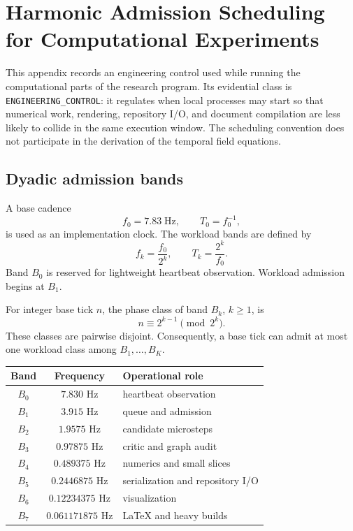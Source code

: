 \documentclass[11pt]{book}
\begin{document}
\appendix
\chapter[Harmonic Admission Scheduling]{Harmonic Admission Scheduling for Computational Experiments}
\label{app:harmonic-admission}

This appendix records an engineering control used while running the computational parts of the research program. Its evidential class is \texttt{ENGINEERING\_CONTROL}: it regulates when local processes may start so that numerical work, rendering, repository I/O, and document compilation are less likely to collide in the same execution window. The scheduling convention does not participate in the derivation of the temporal field equations.

\section{Dyadic admission bands}

A base cadence
\[
f_0 = 7.83\;\mathrm{Hz},
\qquad
T_0=f_0^{-1},
\]
is used as an implementation clock. The workload bands are defined by
\[
f_k=\frac{f_0}{2^k},
\qquad
T_k=\frac{2^k}{f_0}.
\]
Band $B_0$ is reserved for lightweight heartbeat observation. Workload admission begins at $B_1$.

For integer base tick $n$, the phase class of band $B_k$, $k\geq1$, is
\[
n\equiv 2^{k-1}\pmod{2^k}.
\]
These classes are pairwise disjoint. Consequently, a base tick can admit at most one workload class among $B_1,\ldots,B_K$.

\begin{center}
\begin{tabular}{ccl}
\hline
Band & Frequency & Operational role \\
\hline
$B_0$ & $7.830$ Hz & heartbeat observation \\
$B_1$ & $3.915$ Hz & queue and admission \\
$B_2$ & $1.9575$ Hz & candidate microsteps \\
$B_3$ & $0.97875$ Hz & critic and graph audit \\
$B_4$ & $0.489375$ Hz & numerics and small slices \\
$B_5$ & $0.2446875$ Hz & serialization and repository I/O \\
$B_6$ & $0.12234375$ Hz & visualization \\
$B_7$ & $0.061171875$ Hz & LaTeX and heavy builds \\
\hline
\end{tabular}
\end{center}
\end{document}
